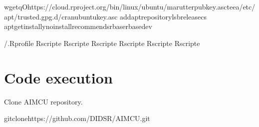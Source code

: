 \documentclass[letterpaper,10pt,oneside,english]{sphinxmanual}
\begin{document}
\begin{sphinxVerbatim}[commandchars=\\\{\}]
wget\PYGZhy{}qO\PYGZhy{}https://cloud.r\PYGZhy{}project.org/bin/linux/ubuntu/marutter\PYGZus{}pubkey.asctee\PYGZhy{}a/etc/apt/trusted.gpg.d/cran\PYGZus{}ubuntu\PYGZus{}key.asc
add\PYGZhy{}apt\PYGZhy{}repositorylsb\PYGZus{}release\PYGZhy{}cs
apt\PYGZhy{}getinstall\PYGZhy{}y\PYGZhy{}\PYGZhy{}no\PYGZhy{}install\PYGZhy{}recommendsr\PYGZhy{}baser\PYGZhy{}base\PYGZhy{}dev

\PYGZgt{}\PYGZti{}/.Rprofile
Rscript\PYGZhy{}e
Rscript\PYGZhy{}e
Rscript\PYGZhy{}e
Rscript\PYGZhy{}e
Rscript\PYGZhy{}e
Rscript\PYGZhy{}e
\end{sphinxVerbatim}


\chapter{Code execution}
\label{\detokenize{index:code-execution}}
\sphinxAtStartPar
Clone AIM\sphinxhyphen{}CU repository.

\begin{sphinxVerbatim}[commandchars=\\\{\}]
gitclonehttps://github.com/DIDSR/AIM\PYGZhy{}CU.git
\end{sphinxVerbatim}
\end{document}
